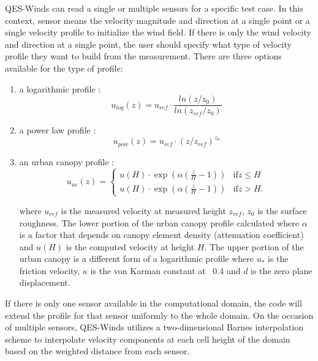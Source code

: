 QES-Winds can read a single or multiple sensors for a specific test case. In this context, sensor means the velocity magnitude and direction at a single point or a single velocity profile to initialize the wind field. If there is only the wind velocity and direction at a single point, the user should specify what type of velocity profile they want to build from the measurement. There are three options available for the type of profile:

\begin{enumerate}
\item a logarithmic profile \cite{favaloro2008toward}:
\begin{equation}
\label{eq:log_law}
u_{log}(z) = u_{ref}\cdot\frac{ln(z/z_0)}{ln(z_{ref}/z_0)}
\end{equation}

\item a power law profile \cite{favaloro2008toward}:
\begin{equation}
\label{eq:power_law}
u_{pow}(z) = u_{ref}\cdot(z/z_{ref})^{z_0}
\end{equation}

\item an urban canopy profile \cite{favaloro2008toward,pardyjak2008near}:
\begin{equation}
\label{eq:urban_canopy_low}
u_{uc}(z)=\begin{cases}
u(H)\cdot\exp(\alpha(\frac{z}{H}-1)) & \text{if} z\leq H\\
u(H)\cdot\exp(\alpha(\frac{z}{H}-1))& \text{if} z > H.
\end{cases}
\end{equation}

where $u_{ref}$ is the measured velocity at measured height $z_{ref}$, $z_0$ is the surface
roughness. The lower portion of the urban canopy profile calculated where $\alpha$ is a factor that depends on canopy
element density (attenuation coefficient) and $u(H)$ is the computed velocity at height $H$. The upper portion of the urban canopy is a different form of a logarithmic profile where $u_*$ is the friction velocity,
$\kappa$ is the von Karman constant at ~0.4 and $d$ is the zero plane displacement.

\end{enumerate}

If there is only one sensor available in the computational domain, the code will extend the profile for that sensor uniformly to the whole domain. On the occasion of multiple sensors, QES-Winds utilizes a two-dimensional Barnes interpolation scheme \cite{koch1983interactive,booth2012validation} to interpolate velocity components at each cell height of the domain based on the weighted distance from each sensor.

